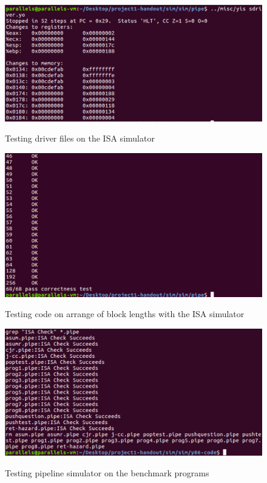 \documentclass{article}
\begin{document}
\begin{figure}[H]	
	\begin{minipage}[h]{\textwidth}	
		\centering
		\includegraphics[width=1\textwidth]{driver_file_test.png}
		\caption{Testing driver files on the ISA simulator} \label{Fig-G9}
		\hspace{5mm}
		\includegraphics[width=1\textwidth]{arrang_block_test_ISA.png}
		\caption{Testing code on arrange of block lengths with the ISA simulator} \label{Fig-G10}
		\hspace{5mm}
		\includegraphics[width=1\textwidth]{benchmark_test.png}
		\caption{Testing pipeline simulator on the benchmark programs} \label{Fig-G11}
		\hspace{5mm}	
	\end{minipage}
\end{figure}
\end{document}
